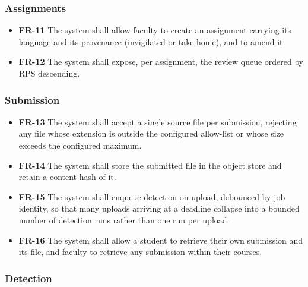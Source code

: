 \hypertarget{assignments}{%
\subsubsection{Assignments}\label{assignments}}

\begin{itemize}
\tightlist
\item
  \textbf{FR-11} The system shall allow faculty to create an assignment
  carrying its language and its provenance (invigilated or take-home),
  and to amend it.
\item
  \textbf{FR-12} The system shall expose, per assignment, the review
  queue ordered by RPS descending.
\end{itemize}

\hypertarget{submission}{%
\subsubsection{Submission}\label{submission}}

\begin{itemize}
\tightlist
\item
  \textbf{FR-13} The system shall accept a single source file per
  submission, rejecting any file whose extension is outside the
  configured allow-list or whose size exceeds the configured maximum.
\item
  \textbf{FR-14} The system shall store the submitted file in the object
  store and retain a content hash of it.
\item
  \textbf{FR-15} The system shall enqueue detection on upload, debounced
  by job identity, so that many uploads arriving at a deadline collapse
  into a bounded number of detection runs rather than one run per
  upload.
\item
  \textbf{FR-16} The system shall allow a student to retrieve their own
  submission and its file, and faculty to retrieve any submission within
  their courses.
\end{itemize}

\hypertarget{detection}{%
\subsubsection{Detection}\label{detection}}

